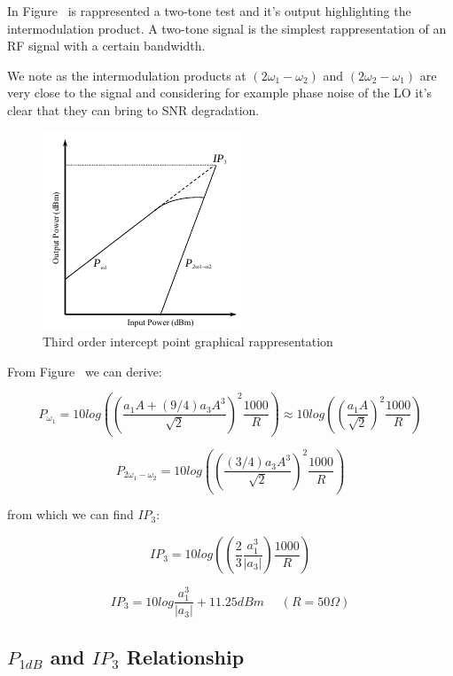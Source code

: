 In Figure~\label{fig:spec} is rappresented a two-tone test and it's output highlighting the intermodulation product.
A two-tone signal is the simplest rappresentation of an RF signal with a certain bandwidth.

We note as the intermodulation products at $(2\omega_1-\omega_2)$ and $(2\omega_2-\omega_1)$ are very close to the signal and considering for example phase noise of the LO it's clear that they can bring to SNR degradation.

\begin{figure}[ht]
	\centering
	\includegraphics[scale=0.8]{Immagini/ip3}
	\caption{Third order intercept point graphical rappresentation}
	\label{fig:ip3}
\end{figure}


From Figure~\label{fig:ip3} we can derive:

\begin{equation}
	P_{\omega_1}= 10log\left(\left( \frac{a_1A+(9/4)a_3A^3}{\sqrt{2}}\right)^2\frac{1000}{R}\right) \approx 10log\left(\left( \frac{a_1A}{\sqrt{2}}\right)^2\frac{1000}{R}\right)
\end{equation}

\begin{equation}
	P_{2\omega_1-\omega_2}= 10log\left(\left( \frac{(3/4)a_3A^3}{\sqrt{2}}\right)^2\frac{1000}{R}\right)
\end{equation}

from which we can find $IP_3$:

\begin{equation}
	IP_3= 10log\left(\left( \frac{2}{3} \frac{a_1^3}{|a_3|}\right)\frac{1000}{R}\right)
\end{equation}

\begin{equation}
	IP_3 = 10log\frac{a_1^3}{|a_3|}+11.25dBm   \ \ \ \ \ \ (R= 50\Omega)
\end{equation}


\subsection{$P_{1dB}$ and $IP_3$ Relationship} %
\label{sub:_p_1dB_and_ip_3_relationship}

